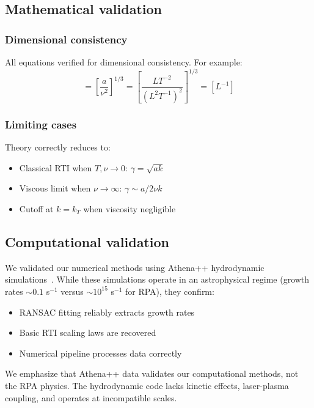 \documentclass[aps,pre,twocolumn,showpacs,superscriptaddress]{revtex4-2}
\theoremstyle{definition}
\begin{document}
\subsection{Mathematical validation}

\subsubsection{Dimensional consistency}
All equations verified for dimensional consistency. For example:
\begin{equation}
[k_{\nu,3}] = \left[\frac{a}{\nu^2}\right]^{1/3} = \left[\frac{LT^{-2}}{(L^2T^{-1})^2}\right]^{1/3} = [L^{-1}]
\end{equation}

\subsubsection{Limiting cases}
Theory correctly reduces to:
\begin{itemize}
\item Classical RTI when $T,\nu \to 0$: $\gamma = \sqrt{ak}$
\item Viscous limit when $\nu \to \infty$: $\gamma \sim a/2\nu k$
\item Cutoff at $k = k_T$ when viscosity negligible
\end{itemize}

\subsection{Computational validation}

We validated our numerical methods using Athena++ hydrodynamic simulations~\cite{Stone2020ApJS,McClellan2023}. While these simulations operate in an astrophysical regime (growth rates $\sim 0.1$ s$^{-1}$ versus $\sim 10^{15}$ s$^{-1}$ for RPA), they confirm:

\begin{itemize}
\item RANSAC fitting reliably extracts growth rates
\item Basic RTI scaling laws are recovered
\item Numerical pipeline processes data correctly
\end{itemize}

We emphasize that Athena++ data validates our computational methods, not the RPA physics. The hydrodynamic code lacks kinetic effects, laser-plasma coupling, and operates at incompatible scales.
\end{document}
